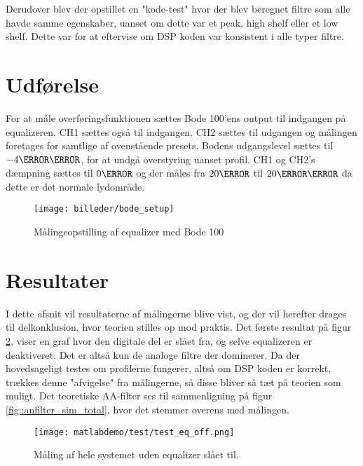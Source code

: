 Derudover blev der opstillet en "kode-test" hvor der blev beregnet filtre som alle havde samme egenskaber, uanset om dette var et peak, high shelf eller et low shelf. Dette var for at eftervise om DSP koden var konsistent i alle typer filtre. \\

\section{Udførelse}
For at måle overføringsfunktionen sættes Bode 100'ens output til indgangen på equalizeren. CH1 sættes også til indgangen. CH2 sættes til udgangen og målingen foretages for samtlige af ovenstående presets. Bodens udgangslevel sættes til $-4\decibel\milli$, for at undgå overstyring uanset profil. CH1 og CH2's dæmpning sættes til $0\decibel$ og der måles fra $20\hertz$ til $20\kilo\hertz$ da dette er det normale lydområde.\\


\begin{figure}[h!]\label{fig:bode_setup}
	\centering
	\texttt{[image: billeder/bode\_setup]}
	\caption{Målingeopstilling af equalizer med Bode 100}
\end{figure}	

\FloatBlock

\section{Resultater}
I dette afsnit vil resultaterne af målingerne blive vist, og der vil herefter drages til delkonklusion, hvor teorien stilles op mod praktis.
Det første resultat på figur \ref{fig:eq_off1}, viser en graf hvor den digitale del er slået fra, og selve equalizeren er deaktiveret. Det er altså kun de analoge filtre der dominerer. Da der hovedsageligt testes om profilerne fungerer, altså om DSP koden er korrekt, trækkes denne "afvigelse" fra målingerne, så disse bliver så tæt på teorien som muligt. Det teoretiske AA-filter ses til sammenligning på figur \ref{fig::anfilter_sim_total}, hvor det stemmer overens med målingen.

\begin{figure}[h!]
	\centering
	\texttt{[image: matlabdemo/test/test\_eq\_off.png]}  
	\caption{Måling af hele systemet uden equalizer slået til.}
	\label{fig:eq_off1}
\end{figure}

